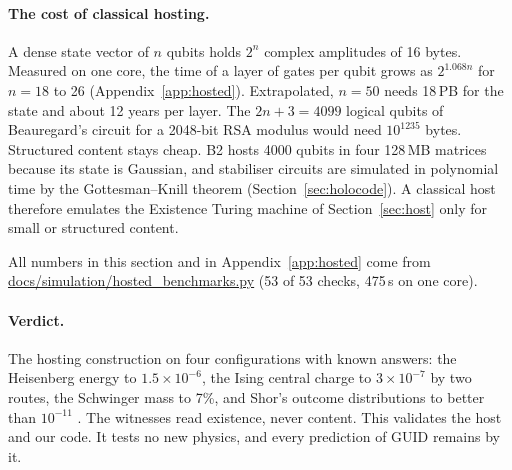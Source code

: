 \paragraph{The cost of classical hosting.} A dense state vector of $n$ qubits holds $2^n$ complex amplitudes of 16 bytes. Measured on one
core, the time of a layer of gates per qubit grows as $2^{1.068n}$ for $n=18$ to 26 (Appendix~\ref{app:hosted}). Extrapolated, $n=50$
needs 18\,PB for the state and about 12 years per layer. The $2n+3=4099$ logical qubits of Beauregard's circuit for a 2048-bit RSA modulus
\cite{beauregard2003} would need $10^{1235}$ bytes. Structured content stays cheap. B2 hosts 4000 qubits in four 128\,MB matrices because
its state is Gaussian, and stabiliser circuits are simulated in polynomial time by the Gottesman--Knill theorem
\cite{gottesman1998,aaronson2004} (Section~\ref{sec:holocode}). A classical host therefore emulates the Existence Turing machine of
Section~\ref{sec:host} only for small or structured content.

All numbers in this section and in Appendix~\ref{app:hosted} come from \url{docs/simulation/hosted_benchmarks.py} (53 of 53 checks, 475\,s
on one core).

\paragraph{Verdict.} The hosting construction  on four configurations with known answers: the Heisenberg energy to
$1.5\times10^{-6}$, the Ising central charge to $3\times10^{-7}$ by two routes, the Schwinger mass to 7\%, and Shor's outcome distributions
to better than $10^{-11}$ \tagS. The witnesses read existence, never content. This validates the host and our code. It tests no new
physics, and every prediction of GUID remains  by it.
